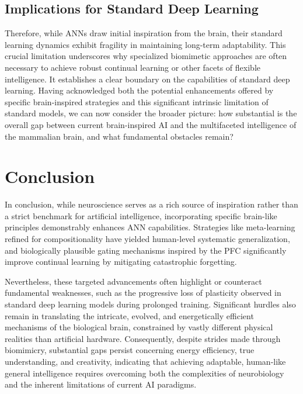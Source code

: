 \documentclass[
10pt, %
a4paper, %
oneside, %
headinclude,footinclude, %
BCOR5mm, %
]{scrartcl}
\begin{document}
\subsection{Implications for Standard Deep Learning}

Therefore, while ANNs draw initial inspiration from the brain, their standard learning dynamics exhibit fragility in maintaining long-term adaptability. This crucial limitation underscores why specialized biomimetic approaches are often necessary to achieve robust continual learning or other facets of flexible intelligence. It establishes a clear boundary on the capabilities of standard deep learning. Having acknowledged both the potential enhancements offered by specific brain-inspired strategies and this significant intrinsic limitation of standard models, we can now consider the broader picture: how substantial is the overall gap between current brain-inspired AI and the multifaceted intelligence of the mammalian brain, and what fundamental obstacles remain?

\section{Conclusion}

In conclusion, while neuroscience serves as a rich source of inspiration rather than a strict benchmark for artificial intelligence, incorporating specific brain-like principles demonstrably enhances ANN capabilities. Strategies like meta-learning refined for compositionality have yielded human-level systematic generalization, and biologically plausible gating mechanisms inspired by the PFC significantly improve continual learning by mitigating catastrophic forgetting. 

Nevertheless, these targeted advancements often highlight or counteract fundamental weaknesses, such as the progressive loss of plasticity observed in standard deep learning models during prolonged training. Significant hurdles also remain in translating the intricate, evolved, and energetically efficient mechanisms of the biological brain, constrained by vastly different physical realities than artificial hardware. Consequently, despite strides made through biomimicry, substantial gaps persist concerning energy efficiency, true understanding, and creativity, indicating that achieving adaptable, human-like general intelligence requires overcoming both the complexities of neurobiology and the inherent limitations of current AI paradigms.
\newpage
\nocite{*}





\end{document}
